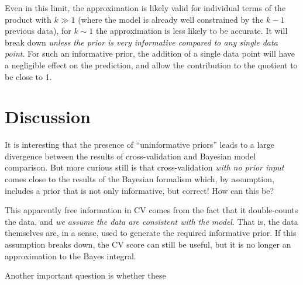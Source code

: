 \documentclass[12pt]{article}
\begin{document}
Even in this limit, the approximation is likely valid for individual terms
of the product with $k \gg 1$
(where the model is already well constrained by the $k-1$ previous data),
for $k \sim 1$ the approximation is less likely to be accurate.
It will break down
{\it unless the prior is very informative compared to any single data point}.
For such an informative prior, the addition of a single data point will
have a negligible effect on the prediction, and allow the contribution to the
quotient to be close to 1.

\section{Discussion}
It is interesting that the presence of ``uninformative priors'' leads to a
large divergence between the results of cross-validation and Bayesian model
comparison.  But more curious still is that cross-validation {\it with no
prior input} comes close to the results of the Bayesian formalism which,
by assumption, includes a prior that is not only informative, but correct!
How can this be?

This apparently free information in CV comes from the fact that it
double-counts the data, and {\it we assume the data are consistent with the
model}.  That is, the data themselves are, in a sense, used to generate
the required informative prior.  If this assumption breaks down, the CV
score can still be useful, but it is no longer an approximation to the
Bayes integral.

Another important question is whether these 
\end{document}
